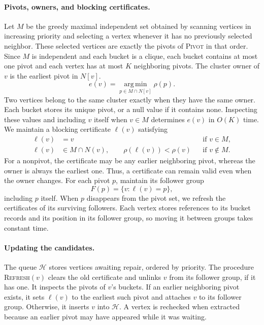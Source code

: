 \documentclass[11pt]{article}
\theoremstyle{definition}
\theoremstyle{remark}
\newcommand{\1}{\mathbf{1}}
\begin{document}
\paragraph{Pivots, owners, and blocking certificates.}
Let $M$ be the greedy maximal independent set obtained by scanning vertices in increasing priority and selecting a vertex whenever it has no previously selected neighbor. These selected vertices are exactly the pivots of \textsc{Pivot} in that order.
Since $M$ is independent and each bucket is a clique, each bucket
contains at most one pivot and each vertex has at most $K$ neighboring
pivots. The cluster owner of $v$ is the earliest pivot in $N[v]$.
\begin{equation}
    e(v)=\operatorname*{arg\,min}_{p\in M\cap N[v]}\rho(p).
    \label{eq:dynamic-owner}
\end{equation}
Two vertices belong to the same cluster exactly when they have the same
owner. Each bucket stores its unique pivot, or a null value if it
contains none. Inspecting these values and including $v$ itself when
$v\in M$ determines $e(v)$ in $O(K)$ time. We maintain a blocking
certificate $\ell(v)$ satisfying
\begin{equation}
\begin{aligned}
    \ell(v)&=v &&\text{if }v\in M,\\
    \ell(v)&\in M\cap N(v),\qquad
    \rho(\ell(v))<\rho(v) &&\text{if }v\notin M.
\end{aligned}
\label{eq:dynamic-certificate}
\end{equation}
For a nonpivot, the certificate may be any earlier neighboring pivot, whereas the owner is always the earliest one. Thus, a certificate can remain valid even when the owner changes. For each pivot $p$, maintain its follower group
\[
    F(p)=\{v:\ell(v)=p\},
\]
including $p$ itself. When $p$ disappears from the pivot set, we refresh the certificates of its surviving followers. Each vertex stores references to its bucket records and its position in its follower group, so moving it between groups takes constant time.

\paragraph{Updating the candidates.}
The queue $\mathcal H$ stores vertices awaiting repair, ordered by
priority. The procedure \textsc{Refresh}$(v)$ clears the old certificate
and unlinks $v$ from its follower group, if it has one. It inspects the
pivots of $v$'s buckets. If an earlier neighboring pivot exists, it sets
$\ell(v)$ to the earliest such pivot and attaches $v$ to its follower
group. Otherwise, it inserts $v$ into $\mathcal H$. A vertex is rechecked
when extracted because an earlier pivot may have appeared while it
was waiting.
\end{document}
